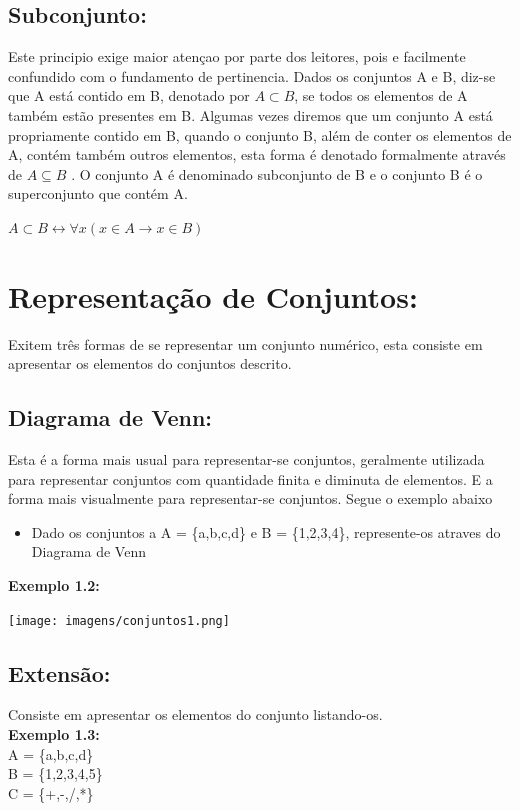 \documentclass[a4paper,12pt,twoside,BCOR=10mm]{scrbook}
\begin{document}
\begin{titlepage}
\subsection{Subconjunto:}
Este principio exige maior atençao por parte dos leitores, pois e facilmente confundido com o fundamento de pertinencia. Dados os conjuntos A e B, diz-se que A está contido em B, denotado por $A \subset B$, se todos os elementos de A também estão presentes em B. Algumas vezes diremos que um conjunto A está propriamente contido em B, quando o conjunto B, além de conter os elementos de A, contém também outros elementos, esta forma é denotado formalmente através de $A \subseteq B$ . O conjunto A é denominado subconjunto de B e o conjunto B é o superconjunto que contém A.
\begin{center}
 $A \subset B \leftrightarrow  \forall x (x \in A \rightarrow x \in B)$
\end{center}

\section{Representação de Conjuntos:}
Exitem três formas de se representar um conjunto numérico, esta consiste em apresentar os elementos do conjuntos descrito.

\subsection{Diagrama de Venn:}
Esta é a forma mais usual para representar-se conjuntos, geralmente utilizada para representar conjuntos com quantidade finita e diminuta de elementos. E a forma mais visualmente para representar-se conjuntos. Segue o exemplo abaixo
\begin{itemize}
\item Dado os conjuntos a A = \{a,b,c,d\} e B = \{1,2,3,4\}, represente-os atraves do Diagrama de Venn
\end{itemize}
\textbf{Exemplo 1.2:}
\begin{center}
\texttt{[image: imagens/conjuntos1.png]}
\end{center}

\subsection{Extensão:}
Consiste em apresentar os elementos do conjunto listando-os.\\
\textbf{Exemplo 1.3:}\\ A = \{a,b,c,d\}\\ B = \{1,2,3,4,5\}\\ C = \{+,-,/,*\}\\


\end{titlepage}
\end{document}
